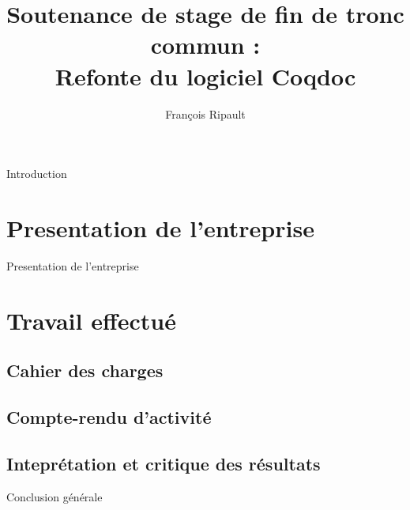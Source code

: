 \documentclass[compress]{beamer}
\title{Soutenance de stage de fin de tronc commun : \\ Refonte du logiciel Coqdoc}
\author{François Ripault}
\begin{document}
\begin{frame}
  \titlepage
\end{frame}

\begin{frame}{Introduction}
\end{frame}

\begin{frame}
\tableofcontents
\end{frame}

\section{Presentation de l'entreprise}
\begin{frame}{Presentation de l'entreprise}
\end{frame}

\section{Travail effectué}
\subsection{Cahier des charges}
\subsection{Compte-rendu d'activité}
\subsection{Inteprétation et critique des résultats}
\begin{frame}{Conclusion générale}
\end{frame}
\end{document}
